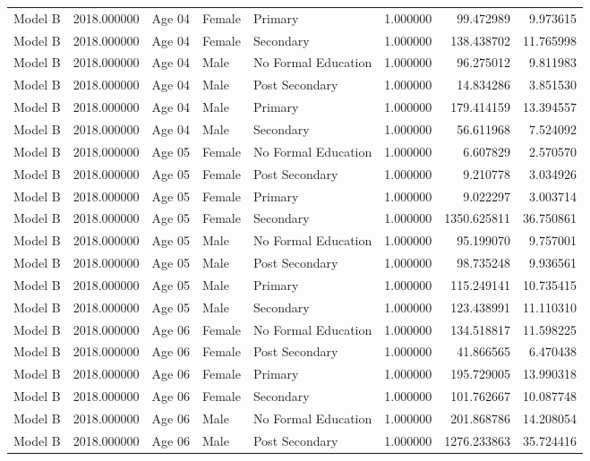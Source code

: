 \begin{table}[ht]
\begin{tabular}{lrlllrrr}
Model B & 2018.000000 & Age 04 & Female & Primary & 1.000000 & 99.472989 & 9.973615 \\
Model B & 2018.000000 & Age 04 & Female & Secondary & 1.000000 & 138.438702 & 11.765998 \\
Model B & 2018.000000 & Age 04 & Male & No Formal Education & 1.000000 & 96.275012 & 9.811983 \\
Model B & 2018.000000 & Age 04 & Male & Post Secondary & 1.000000 & 14.834286 & 3.851530 \\
Model B & 2018.000000 & Age 04 & Male & Primary & 1.000000 & 179.414159 & 13.394557 \\
Model B & 2018.000000 & Age 04 & Male & Secondary & 1.000000 & 56.611968 & 7.524092 \\
Model B & 2018.000000 & Age 05 & Female & No Formal Education & 1.000000 & 6.607829 & 2.570570 \\
Model B & 2018.000000 & Age 05 & Female & Post Secondary & 1.000000 & 9.210778 & 3.034926 \\
Model B & 2018.000000 & Age 05 & Female & Primary & 1.000000 & 9.022297 & 3.003714 \\
Model B & 2018.000000 & Age 05 & Female & Secondary & 1.000000 & 1350.625811 & 36.750861 \\
Model B & 2018.000000 & Age 05 & Male & No Formal Education & 1.000000 & 95.199070 & 9.757001 \\
Model B & 2018.000000 & Age 05 & Male & Post Secondary & 1.000000 & 98.735248 & 9.936561 \\
Model B & 2018.000000 & Age 05 & Male & Primary & 1.000000 & 115.249141 & 10.735415 \\
Model B & 2018.000000 & Age 05 & Male & Secondary & 1.000000 & 123.438991 & 11.110310 \\
Model B & 2018.000000 & Age 06 & Female & No Formal Education & 1.000000 & 134.518817 & 11.598225 \\
Model B & 2018.000000 & Age 06 & Female & Post Secondary & 1.000000 & 41.866565 & 6.470438 \\
Model B & 2018.000000 & Age 06 & Female & Primary & 1.000000 & 195.729005 & 13.990318 \\
Model B & 2018.000000 & Age 06 & Female & Secondary & 1.000000 & 101.762667 & 10.087748 \\
Model B & 2018.000000 & Age 06 & Male & No Formal Education & 1.000000 & 201.868786 & 14.208054 \\
Model B & 2018.000000 & Age 06 & Male & Post Secondary & 1.000000 & 1276.233863 & 35.724416 \\

\end{tabular}
\end{table}
